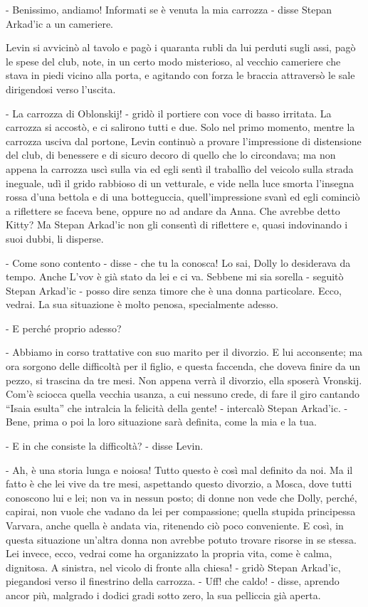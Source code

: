 - Benissimo, andiamo! Informati se è venuta la mia carrozza - disse Stepan Arkad'ic a un cameriere. 

Levin si avvicinò al tavolo e pagò i quaranta rubli da lui perduti sugli assi, pagò le spese del club, note, in un certo modo misterioso, al vecchio cameriere che stava in piedi vicino alla porta, e agitando con forza le braccia attraversò le sale dirigendosi verso l'uscita. 

\label{ix-6} 

- La carrozza di Oblonskij! - gridò il portiere con voce di basso irritata. La carrozza si accostò, e ci salirono tutti e due. Solo nel primo momento, mentre la carrozza usciva dal portone, Levin continuò a provare l'impressione di distensione del club, di benessere e di sicuro decoro di quello che lo circondava; ma non appena la carrozza uscì sulla via ed egli sentì il traballìo del veicolo sulla strada ineguale, udì il grido rabbioso di un vetturale, e vide nella luce smorta l'insegna rossa d'una bettola e di una botteguccia, quell'impressione svanì ed egli cominciò a riflettere se faceva bene, oppure no ad andare da Anna. Che avrebbe detto Kitty? Ma Stepan Arkad'ic non gli consentì di riflettere e, quasi indovinando i suoi dubbi, li disperse. 

- Come sono contento - disse - che tu la conosca! Lo sai, Dolly lo desiderava da tempo. Anche L'vov è già stato da lei e ci va. Sebbene mi sia sorella - seguitò Stepan Arkad'ic - posso dire senza timore che è una donna particolare. Ecco, vedrai. La sua situazione è molto penosa, specialmente adesso. 

- E perché proprio adesso? 

- Abbiamo in corso trattative con suo marito per il divorzio. E lui acconsente; ma ora sorgono delle difficoltà per il figlio, e questa faccenda, che doveva finire da un pezzo, si trascina da tre mesi. Non appena verrà il divorzio, ella sposerà Vronskij. Com'è sciocca quella vecchia usanza, a cui nessuno crede, di fare il giro cantando ``Isaia esulta'' che intralcia la felicità della gente! - intercalò Stepan Arkad'ic. - Bene, prima o poi la loro situazione sarà definita, come la mia e la tua. 

- E in che consiste la difficoltà? - disse Levin. 

- Ah, è una storia lunga e noiosa! Tutto questo è così mal definito da noi. Ma il fatto è che lei vive da tre mesi, aspettando questo divorzio, a Mosca, dove tutti conoscono lui e lei; non va in nessun posto; di donne non vede che Dolly, perché, capirai, non vuole che vadano da lei per compassione; quella stupida principessa Varvara, anche quella è andata via, ritenendo ciò poco conveniente. E così, in questa situazione un'altra donna non avrebbe potuto trovare risorse in se stessa. Lei invece, ecco, vedrai come ha organizzato la propria vita, come è calma, dignitosa. A sinistra, nel vicolo di fronte alla chiesa! - gridò Stepan Arkad'ic, piegandosi verso il finestrino della carrozza. - Uff! che caldo! - disse, aprendo ancor più, malgrado i dodici gradi sotto zero, la sua pelliccia già aperta. 


